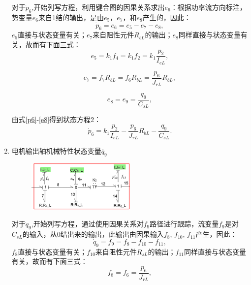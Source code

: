 \begin{enumerate}
对于$\dot{p} _ { 6 }$,开始列写方程，利用键合图的因果关系求出$e_6$：根据功率流方向标注，势变量$e_6$来自1结的输出，是由$e_5$，$e_7$，和$e_8$产生的，因此：
\begin{equation}\label{p6}
\dot{ p } _ { 6 } = e _ { 6 } = e _ { 5 } - e _ { 7 } - e _ { 8 },
\end{equation}
$e_5$直接与状态变量有关；$e_7$来自阻性元件$R _ { bL }$的输出；$e_8$同样直接与状态变量有关，故而有下面三式：
\begin{equation}
e _ { 5 } = k _ { 1 } f _ { 4 } = k _ { 1 } f _ { 2 } = k _ { 1 } \frac { p _ { 2 } } { I _ { eL }  },
\end{equation}

\begin{equation}
e _ { 7 } = f _ { 7 } R _ { bL }  = f _ { 6 } R _ { b L }  = \frac { p _ { 6 } } { J _ { rL }  } R _ { bL} ,
\end{equation}

\begin{equation}\label{e8}
e _ { 8 } = e _ { 9 } = \frac { q _ { 9 } } { C _ { s L}  } ,
\end{equation}

由式\ref{p6}-\ref{e8}得到状态方程2：
\begin{equation}
\dot{ p } _ { 6 } = k _ { 1 } \frac { p _ { 2 } } { I _ { e L }  } - \frac { p_ { 6 } } { J _ { rL}  } R _ { bL}  - \frac { q _ { 9 } } { C _ { sL }  }.
\end{equation}

\item {电机输出轴机械特性状态变量$\dot{ q_9 }$}
\begin{figure}[h]
	\centering
	\includegraphics[width=0.5\textwidth]{fig/equation3.png}
	\caption{}\label{fig:equation3}
\end{figure}
对于$\dot{q} _ { 9 }$,开始列写方程，通过使用因果关系对$f_9$路径进行跟踪，流变量$f_9$是对$C_{sL}$的输入，从0结出来的输出，此输出由因果输入$f _ { 8 }$, $ f _ { 10 }$, $  f _ { 11 }$产生，因此：
\begin{equation}\label{q9}
\dot{ q }_{ 9 } = f _ { 9 } = f _ { 8 } - f _ { 10 } - f _ { 11 },
\end{equation}
$f_8$直接与状态变量有关；$f_{10}$来自阻性元件$R _ { sL }$的输出；$f_{11}$同样直接与状态变量有关，故而有下面三式：
\begin{equation}
f _ { 8 } = f _ { 6 } = \frac { p _ { 6 } } { J _ { r L } },
\end{equation}


\end{enumerate}
